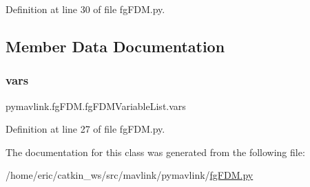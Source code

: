 Definition at line 30 of file fg\+F\+D\+M.\+py.



\subsection{Member Data Documentation}
\mbox{\label{classpymavlink_1_1fgFDM_1_1fgFDMVariableList_a6c727c14aa93c3f24e8af01ed41ff4af}} 
\subsubsection{\texorpdfstring{vars}{vars}}
{\footnotesize\ttfamily pymavlink.\+fg\+F\+D\+M.\+fg\+F\+D\+M\+Variable\+List.\+vars}



Definition at line 27 of file fg\+F\+D\+M.\+py.



The documentation for this class was generated from the following file\+:\begin{DoxyCompactItemize}
\item 
/home/eric/catkin\+\_\+ws/src/mavlink/pymavlink/\mbox{\hyperlink{fgFDM_8py}{fg\+F\+D\+M.\+py}}\end{DoxyCompactItemize}
